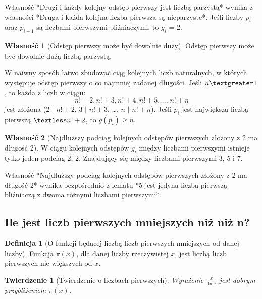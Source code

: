 \documentclass[10pt,onecolumn]{article}
\newtheorem{theorem}{Twierdzenie}
\theoremstyle{definition}
\newtheorem{definition}{Definicja}
\theoremstyle{hypothesis}
\theoremstyle{capability}
\newtheorem{capability}{Własność}
\begin{document}
Własność *Drugi i każdy kolejny odstęp pierwszy jest liczbą parzystą* wynika z własności *Druga i każda kolejna liczba pierwsza są nieparzyste*. Jeśli liczby $p_i$ oraz $p_{i+1}$ są liczbami pierwszymi bliźniaczymi, to $g_i$ = 2. 

\begin{capability}[Odstęp pierwszy może być dowolnie duży]
Odstęp pierwszy może być dowolnie dużą liczbą parzystą.
\end{capability}

W naiwny sposób łatwo zbudować ciąg kolejnych liczb naturalnych, w których występuje odstęp pierwszy o co najmniej zadanej długości. Jeśli $n \textgreater 1$, to każda z liczb w ciągu: $$n!+2, n!+3, n!+4, n!+5, \ldots, n!+n$$ jest złożona ($2$ $\mid$ $n!+2$, $3$ $\mid$ $n!+3$, \ldots, $n$ $\mid$ $n!+n$). Jeśli $p_i$ jest największą liczbą pierwszą $\textless n!+2$, to $g(p_i) \geq n$. 

\begin{capability}[Najdłuższy podciąg kolejnych odstępów pierwszych złożony z 2 ma długość 2]
W ciągu kolejnych odstępów $g_i$ między liczbami pierwszymi istnieje tylko jeden podciąg 2, 2. Znajdujący się między liczbami pierwszymi 3, 5 i 7.
\end{capability}

Własność *Najdłuższy podciąg kolejnych odstępów pierwszych złożony z 2 ma długość 2* wynika bezpośrednio z lematu *5 jest jedyną liczbą pierwszą bliźniaczą z dwoma różnymi liczbami pierwszymi*.

\subsection{Ile jest liczb pierwszych mniejszych niż niż n?}

\begin{definition} [O funkcji będącej liczbą liczb pierwszych mniejszych od danej liczby]
Funkcja $\pi (x)$, dla danej liczby rzeczywistej $x$, jest liczbą liczb pierwszych nie większych od $x$.
\end{definition}

\begin{theorem}[Twierdzenie o liczbach pierwszych]
Wyrażenie $\frac {x}{\ln x}$ jest dobrym przybliżeniem $\pi (x)$.
\end{theorem}

\newpage

\end{document}
